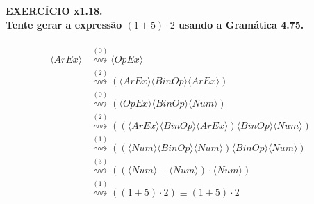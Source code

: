 \documentclass[a4paper, 12pt]{article}
\begin{document}
\noindent \textbf{EXERCÍCIO x1.18. \\
Tente gerar a expressão
$(1 + 5) \cdot 2$
usando a Gramática 4.75.} \\ \\
\begin{align*}
    \langle ArEx \rangle &\stackrel{(0)}{\rightsquigarrow} \langle OpEx \rangle \\
    &\stackrel{(2)}{\rightsquigarrow} 
    ( \langle ArEx \rangle
    \langle BinOp \rangle
    \langle ArEx \rangle ) \\
    &\stackrel{(0)}{\rightsquigarrow} 
   ( \langle OpEx \rangle
    \langle BinOp \rangle
    \langle Num \rangle
    ) \\
    &\stackrel{(2)}{\rightsquigarrow} 
    ( ( \langle ArEx \rangle
    \langle BinOp \rangle
    \langle ArEx \rangle )
    \langle BinOp \rangle
    \langle Num \rangle
    ) \\
    &\stackrel{(1)}{\rightsquigarrow} 
    ( ( \langle Num \rangle
    \langle BinOp \rangle
    \langle Num \rangle )
    \langle BinOp \rangle
    \langle Num \rangle
    ) \\
    &\stackrel{(3)}{\rightsquigarrow} 
    ( ( \langle Num \rangle
    +
    \langle Num \rangle )
    \cdot
    \langle Num \rangle
    ) \\
    &\stackrel{(1)}{\rightsquigarrow} 
    ( (1+5)\cdot 2) \equiv (1+5)\cdot 2
\end{align*}
\end{document}
